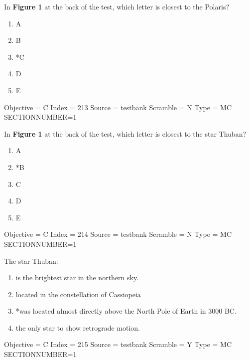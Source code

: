 \documentclass[11pt]{article}
\begin{document}
\begin{enumerate}
\begin{minipage}{\textwidth}
\begin{minipage}{\textwidth}
\item In {\bf Figure 1} at the back of the test, which letter is closest to the Polaris?
\begin{multicols}{3}
\begin{enumerate} 
\setlength{\itemsep}{1pt} 
\setlength{\parskip}{0pt} 
\setlength{\parsep}{0pt}
\setlength{\multicolsep}{1pt} 
\item A
\item B
\item *C
\item D
\item E
\end{enumerate} 
\vfill 
\end{multicols}

Objective = C
Index = 213
Source = testbank
Scramble = N
Type = MC
SECTIONNUMBER=1
\end{minipage}
\end{minipage}
\vskip 0.20in

\begin{minipage}{\textwidth}
\begin{minipage}{\textwidth}
\item In {\bf Figure 1} at the back of the test, which letter is closest to the star Thuban?
\begin{multicols}{3}
\begin{enumerate} 
\setlength{\itemsep}{1pt} 
\setlength{\parskip}{0pt} 
\setlength{\parsep}{0pt}
\setlength{\multicolsep}{1pt} 
\item A
\item *B
\item C
\item D
\item E
\end{enumerate} 
\vfill 
\end{multicols}

Objective = C
Index = 214
Source = testbank
Scramble = N
Type = MC
SECTIONNUMBER=1
\end{minipage}
\end{minipage}
\vskip 0.20in

\begin{minipage}{\textwidth}
\begin{minipage}{\textwidth}
\item The star Thuban:
\begin{enumerate} 
\setlength{\itemsep}{1pt} 
\setlength{\parskip}{0pt} 
\setlength{\parsep}{0pt}
\setlength{\multicolsep}{1pt} 
\item is the brightest star in the northern sky.
\item located in the constellation of Cassiopeia
\item *was located almost directly above the North Pole of Earth in 3000 BC.
\item the only star to show retrograde motion.
\end{enumerate} 
Objective = C
Index = 215
Source = testbank
Scramble = Y
Type = MC
SECTIONNUMBER=1
\end{minipage}
\end{minipage}
\vskip 0.20in


\end{enumerate}
\end{document}
